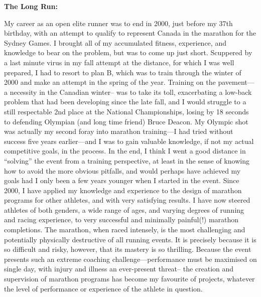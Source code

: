 \bigskip
\textbf{The Long Run:}
\bigskip

My career as an open elite runner was to end in 2000, just before my 37th birthday, with an attempt to qualify to represent Canada in the marathon for the Sydney Games. I brought all of my accumulated fitness, experience, and knowledge to bear on the problem, but was to come up just short. Scuppered by a last minute virus in my fall attempt at the distance, for which I was well prepared, I had to resort to plan B, which was to train through the winter of 2000 and make an attempt in the spring of the year. Training on the pavement—a necessity in the Canadian winter-- was to take its toll, exacerbating a low-back problem that had been developing since the late fall, and I would struggle to a still respectable 2nd place at the National Championships, losing by 18 seconds to defending Olympian (and long time friend) Bruce Deacon. My Olympic shot was actually my second foray into marathon training—I had tried without success five years earlier—and I was to gain valuable knowledge, if not my actual competitive goals, in the process. In the end, I think I went a good distance in “solving” the event from a training perspective, at least in the sense of knowing how to avoid the more obvious pitfalls, and would perhaps have achieved my goals had I only been a few years younger when I started in the event. Since 2000, I have applied my knowledge and experience to the design of marathon programs for other athletes, and with very satisfying results. I have now steered athletes of both genders, a wide range of ages, and varying degrees of running and racing experience, to very successful and minimally painful(!) marathon completions. The marathon, when raced intensely, is the most challenging and potentially physically destructive of all running events. It is precisely because it is so difficult and risky, however, that its mastery is so thrilling. Because the event presents such an extreme coaching challenge—performance must be maximised on single day, with injury and illness an ever-present threat-- the creation and supervision of marathon programs has become my favourite of projects, whatever the level of performance or experience of the athlete in question.


